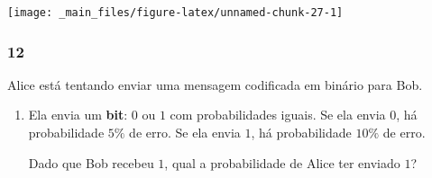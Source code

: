 \documentclass[
  11pt]{report}
\begin{document}
\begin{center}\texttt{[image: \_main\_files/figure-latex/unnamed-chunk-27-1]} \end{center}

\hypertarget{section-12}{%
\subsubsection*{12}\label{section-12}}

\begin{rmdbox}

Alice está tentando enviar uma mensagem codificada em binário para Bob.

\begin{enumerate}
\def\labelenumi{\alph{enumi}.}
\item
  Ela envia um \textbf{bit}: $0$ ou $1$ com probabilidades iguais. Se ela envia $0$, há probabilidade $5\%$ de erro. Se ela envia $1$, há probabilidade $10\%$ de erro.

  Dado que Bob recebeu $1$, qual a probabilidade de Alice ter enviado $1$?
\end{enumerate}

\end{rmdbox}
\end{document}
